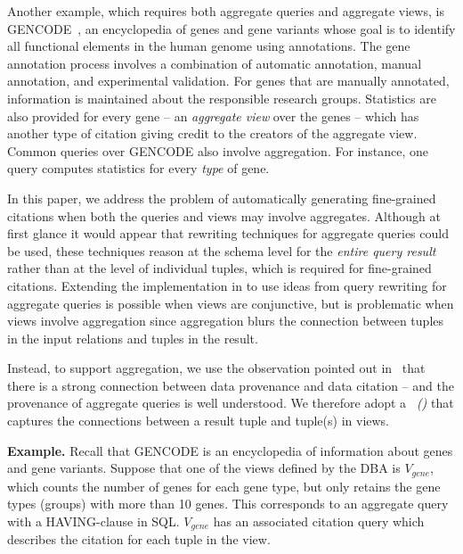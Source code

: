 Another example, which requires both aggregate queries and aggregate views, is GENCODE~\cite{harrow2012gencode}, an encyclopedia of genes and gene variants whose goal is to identify all functional elements in the human genome using annotations. The gene annotation process involves a combination of automatic annotation, manual annotation, and experimental validation. For genes that are manually annotated, information is maintained about the responsible research groups. Statistics are also provided for every gene -- an {\em aggregate view} over the genes -- which has another type of citation giving credit to the creators of the aggregate view.
Common queries over GENCODE also involve aggregation. For instance, one query computes statistics for every \textit{type} of gene.

In this paper, we address the problem of automatically generating fine-grained citations when both the queries and views may involve aggregates.    Although at first glance it would appear that rewriting techniques for aggregate queries \cite{zaharioudakis2000answering, srivastava1996answering, galindo2001orthogonal,cohen2006rewriting,cohen2006user} could be used, these techniques reason at the schema level for the \textit{entire query result} rather than at the level of individual tuples, which is required for fine-grained citations.  
Extending the implementation in \cite{wu2018data} to use ideas from query rewriting for aggregate queries is possible when views are conjunctive, but is problematic when views involve aggregation since aggregation blurs the connection between tuples in the input relations and tuples in the result.  

Instead, to support aggregation, we use the observation pointed out in~\cite{BunemanEtAl2016,alawini2018data} that there is a strong connection between data provenance and data citation -- and the provenance of aggregate queries is well understood.
We therefore adopt a \textit{\pbafull\ (\pba)} that captures the connections between a result tuple and tuple(s) in views.

\textbf{Example.}  Recall that GENCODE is an encyclopedia of information about genes and gene variants.  Suppose that one of the views defined by the DBA  is $V_{gene}$, which counts the number of genes for each gene type, but only retains the gene types (groups) with more than 10 genes.  This corresponds to an aggregate query with a HA\-VING-clause in SQL.  $V_{gene}$ has an associated citation query which describes the citation for each tuple in the view.

